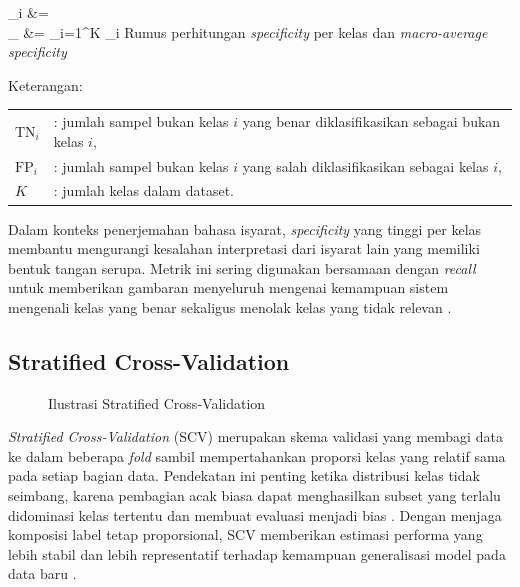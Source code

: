 \begin{enumerate}
	\vspace{0.5cm}
	\begin{equationcaptioned}[eq:2.specificity]{
		_i &=  \\
		_{} &= \sum_{i=1}^{K} _i
	}{
		Rumus perhitungan \textit{specificity} per kelas dan \textit{macro-average specificity}
	}\end{equationcaptioned}
	\vspace{0.5cm}

	\noindent Keterangan:

	\begin{tabular}{@{}ll}
	$\mathrm{TN}_i$ & : jumlah sampel bukan kelas $i$ yang benar diklasifikasikan sebagai bukan kelas $i$, \\
	$\mathrm{FP}_i$ & : jumlah sampel bukan kelas $i$ yang salah diklasifikasikan sebagai kelas $i$, \\
	$K$ & : jumlah kelas dalam dataset. \\
	\end{tabular}

	\vspace{0.5cm}
	Dalam konteks penerjemahan bahasa isyarat, \textit{specificity} yang tinggi per kelas membantu mengurangi kesalahan interpretasi dari isyarat lain yang memiliki bentuk tangan serupa. Metrik ini sering digunakan bersamaan dengan \textit{recall} untuk memberikan gambaran menyeluruh mengenai kemampuan sistem mengenali kelas yang benar sekaligus menolak kelas yang tidak relevan \cite{Raschka2020}.\par

\end{enumerate}
 
\subsection{Stratified Cross-Validation} \label{II.SCV}
\noindent\begin{figure}[H]
	\centering
	
	\caption{Ilustrasi Stratified Cross-Validation}
	\label{fig:II.stratified_kfold}
\end{figure}
\textit{Stratified Cross-Validation} (SCV) merupakan skema validasi yang membagi data ke dalam beberapa \textit{fold} sambil mempertahankan proporsi kelas yang relatif sama pada setiap bagian data. Pendekatan ini penting ketika distribusi kelas tidak seimbang, karena pembagian acak biasa dapat menghasilkan subset yang terlalu didominasi kelas tertentu dan membuat evaluasi menjadi bias \cite{Raschka2020}. Dengan menjaga komposisi label tetap proporsional, SCV memberikan estimasi performa yang lebih stabil dan lebih representatif terhadap kemampuan generalisasi model pada data baru \cite{Raschka2020}.


